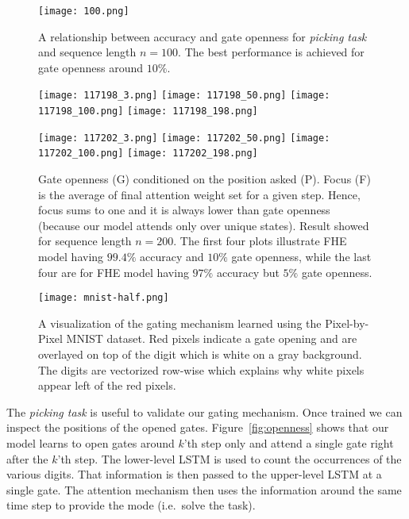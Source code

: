 \begin{figure}[hpt!]
\begin{minipage}{0.48\textwidth}
\centering
\texttt{[image: 100.png]}
\vspace{-0.00cm}
\caption{A relationship between accuracy and gate openness for \emph{picking task} and sequence length $n =100$. The best performance is achieved for gate openness around $10\%$.}
\label{accVSopen100}
\end{minipage}

\bigskip

\begin{minipage}{0.48\textwidth}
\centering
\texttt{[image: 117198\_3.png]} 
\texttt{[image: 117198\_50.png]}
\texttt{[image: 117198\_100.png]} 
\texttt{[image: 117198\_198.png]} 


\texttt{[image: 117202\_3.png]} 
\texttt{[image: 117202\_50.png]}
\texttt{[image: 117202\_100.png]} 
\texttt{[image: 117202\_198.png]} 
\vspace{-0.00cm}
\caption{Gate openness (G) conditioned on the position asked (P). Focus (F) is the average of final attention weight set for a given step. Hence, focus sums to one and it is always lower than gate openness (because our model attends only over unique states). Result showed for sequence length $n = 200$. The first four plots illustrate FHE model having $99.4\%$ accuracy and $10\%$ gate openness, while the last four are for FHE model having $97\%$ accuracy but $5\%$ gate openness.}
\label{fig:openness}
\end{minipage}

\bigskip

\begin{minipage}{0.48\textwidth}
\centering
\texttt{[image: mnist-half.png]}
\caption{A visualization of the gating mechanism learned using the Pixel-by-Pixel MNIST dataset. Red pixels indicate a gate opening and are overlayed on top of the digit which is white on a gray background. The digits are vectorized row-wise which explains why white pixels appear left of the red pixels.}
\label{fig:qca}
\vspace{-0.00cm}
\end{minipage}
\end{figure}

The \emph{picking task} is useful to validate our gating mechanism. Once trained we can inspect the positions of the opened gates. Figure~\ref{fig:openness} shows that our model learns to open gates around $k$'th step only and attend a single gate right after the $k$'th step. The lower-level LSTM is used to count the occurrences of the various digits. That information is then passed to the upper-level LSTM at a single gate. The attention mechanism then uses the information around the same time step to provide the mode (i.e.\, solve the task).

